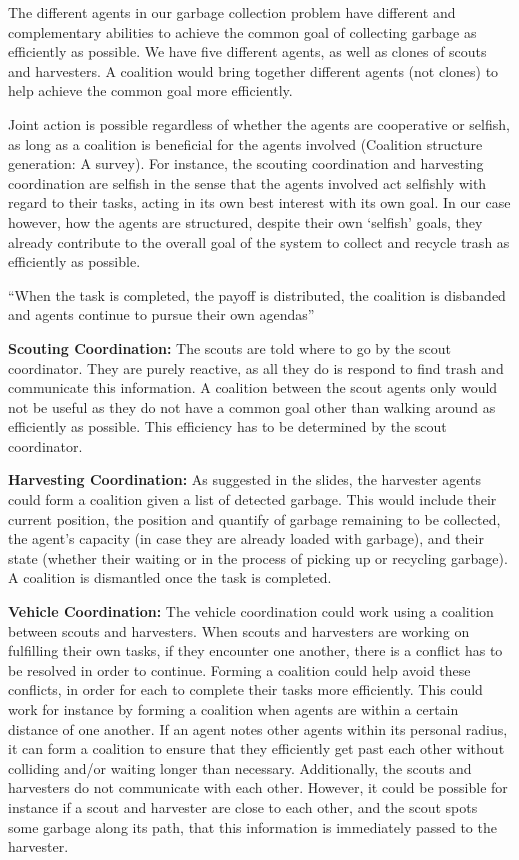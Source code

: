 The different agents in our garbage collection problem have different and complementary abilities to achieve the common goal of collecting garbage as efficiently as possible. We have five different agents, as well as clones of scouts and harvesters. A coalition would bring together different agents (not clones) to help achieve the common goal more efficiently.
 
Joint action is possible regardless of whether the agents are cooperative or selfish, as long as a coalition is beneficial for the agents involved (Coalition structure generation: A survey).  For instance, the scouting coordination and harvesting coordination are selfish in the sense that the agents involved act selfishly with regard to their tasks, acting in its own best interest with its own goal. In our case however, how the agents are structured, despite their own ‘selfish’ goals, they already contribute to the overall goal of the system to collect and recycle trash as efficiently as possible.
 
``When the task is completed, the payoff is distributed, the coalition is disbanded and agents continue to pursue their own agendas''

\textbf{Scouting Coordination:} The scouts are told where to go by the scout coordinator. They are purely reactive, as all they do is respond to find trash and communicate this information. A coalition between the scout agents only would not be useful as they do not have a common goal other than walking around as efficiently as possible. This efficiency has to be determined by the scout coordinator.  

\textbf{Harvesting Coordination:} As suggested in the slides, the harvester agents could form a coalition given a list of detected garbage. This would include their current position, the position and quantify of garbage remaining to be collected, the agent’s capacity (in case they are already loaded with garbage), and their state (whether their waiting or in the process of picking up or recycling garbage). A coalition is dismantled once the task is completed.

\textbf{Vehicle Coordination:} The vehicle coordination could work using a coalition between scouts and harvesters. When scouts and harvesters are working on fulfilling their own tasks, if they encounter one another, there is a conflict has to be resolved in order to continue. Forming a coalition could help avoid these conflicts, in order for each to complete their tasks more efficiently. This could work for instance by forming a coalition when agents are within a certain distance of one another. If an agent notes other agents within its personal radius, it can form a coalition to ensure that they efficiently get past each other without colliding and/or waiting longer than necessary. Additionally, the scouts and harvesters do not communicate with each other. However, it could be possible for instance if a scout and harvester are close to each other, and the scout spots some garbage along its path, that this information is immediately passed to the harvester. 

